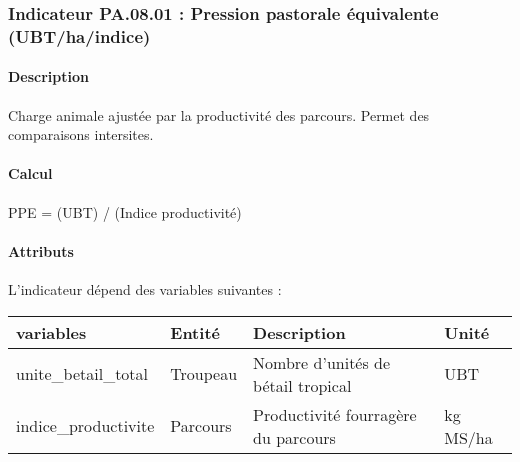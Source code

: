 \documentclass[
]{article}
\newenvironment{Shaded}{\begin{snugshade}}{\end{snugshade}}
\newcommand{\NormalTok}[1]{#1}
\begin{document}
\subsubsection{Indicateur PA.08.01 : Pression pastorale équivalente
(UBT/ha/indice)}\label{indicateur-pa.08.01-pression-pastorale-uxe9quivalente-ubthaindice}

\paragraph{Description}\label{description-7}

Charge animale ajustée par la productivité des parcours. Permet des
comparaisons intersites.

\paragraph{Calcul}\label{calcul-7}

\begin{Shaded}
\begin{Highlighting}[]
\NormalTok{PPE = (UBT) / (Indice productivité)}
\end{Highlighting}
\end{Shaded}

\paragraph{Attributs}\label{attributs-25}

L'indicateur dépend des variables suivantes :

\begin{longtable}[]{@{}
  >{\raggedright\arraybackslash}p{}
  >{\raggedright\arraybackslash}p{}
  >{\raggedright\arraybackslash}p{}
  >{\raggedright\arraybackslash}p{}@{}}
\toprule\noalign{}
\begin{minipage}[b]{\linewidth}\raggedright
\textbf{variables}
\end{minipage} & \begin{minipage}[b]{\linewidth}\raggedright
\textbf{Entité}
\end{minipage} & \begin{minipage}[b]{\linewidth}\raggedright
\textbf{Description}
\end{minipage} & \begin{minipage}[b]{\linewidth}\raggedright
\textbf{Unité}
\end{minipage} \\
\midrule\noalign{}
\endhead
\bottomrule\noalign{}
\endlastfoot
unite\_betail\_total & Troupeau & Nombre d'unités de bétail tropical &
UBT \\
indice\_productivite & Parcours & Productivité fourragère du parcours &
kg MS/ha \\
\end{longtable}
\end{document}
